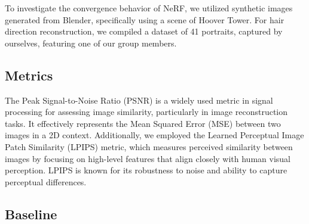 \documentclass[12pt]{article}
\begin{document}
  To investigate the convergence behavior of NeRF, we utilized synthetic images generated from Blender, specifically using a scene of Hoover Tower. For hair direction reconstruction, we compiled a dataset of 41 portraits, captured by ourselves, featuring one of our group members.

  \subsection{Metrics}

  The Peak Signal-to-Noise Ratio (PSNR) is a widely used metric in signal processing for assessing image similarity, particularly in image reconstruction tasks. It effectively represents the Mean Squared Error (MSE) between two images in a 2D context. Additionally, we employed the Learned Perceptual Image Patch Similarity (LPIPS) metric, which measures perceived similarity between images by focusing on high-level features that align closely with human visual perception. LPIPS is known for its robustness to noise and ability to capture perceptual differences.

  \subsection{Baseline}
\end{document}
